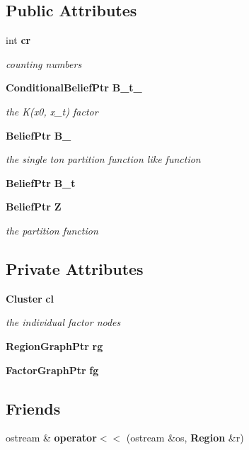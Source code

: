 \subsection*{Public Attributes}
\begin{CompactItemize}
\item 
int {\bf cr}
\begin{CompactList}\small\item\em counting numbers \item\end{CompactList}\item 
{\bf ConditionalBeliefPtr} {\bf B\_\-t\_}
\begin{CompactList}\small\item\em the K(x0, x\_\-t) factor \item\end{CompactList}\item 
{\bf BeliefPtr} {\bf B\_}
\begin{CompactList}\small\item\em the single ton partition function like function \item\end{CompactList}\item 
{\bf BeliefPtr} {\bf B\_\-t}
\item 
{\bf BeliefPtr} {\bf Z}
\begin{CompactList}\small\item\em the partition function \item\end{CompactList}\end{CompactItemize}
\subsection*{Private Attributes}
\begin{CompactItemize}
\item 
{\bf Cluster} {\bf cl}
\begin{CompactList}\small\item\em the individual factor nodes \item\end{CompactList}\item 
{\bf RegionGraphPtr} {\bf rg}
\item 
{\bf FactorGraphPtr} {\bf fg}
\end{CompactItemize}
\subsection*{Friends}
\begin{CompactItemize}
\item 
ostream \& {\bf operator$<$$<$} (ostream \&os, {\bf Region} \&r)
\end{CompactItemize}


